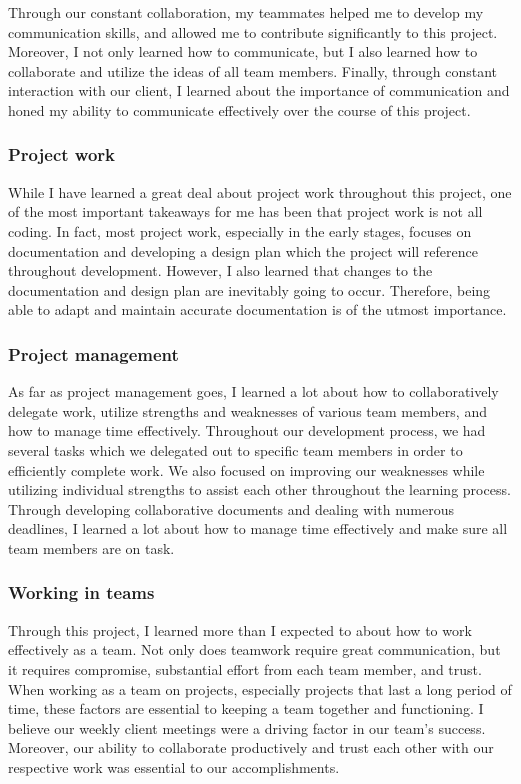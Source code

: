 \documentclass[onecolumn, draftclsnofoot,10pt, compsoc]{IEEEtran}
\begin{document}
\begin{flushleft}
Through our constant collaboration, my teammates helped me to develop my communication skills, and allowed me to contribute significantly to this project. Moreover, I not only learned how to communicate, but I also learned how to collaborate and utilize the ideas of all team members. Finally, through constant interaction with our client, I learned about the importance of communication and honed my ability to communicate effectively over the course of this project.
 
\subsubsection{Project work}
While I have learned a great deal about project work throughout this project, one of the most important takeaways for me has been that project work is not all coding. In fact, most project work, especially in the early stages, focuses on documentation and developing a design plan which the project will reference throughout development. However, I also learned that changes to the documentation and design plan are inevitably going to occur. Therefore, being able to adapt and maintain accurate documentation is of the utmost importance.
 
\subsubsection{Project management}
As far as project management goes, I learned a lot about how to collaboratively delegate work, utilize strengths and weaknesses of various team members, and how to manage time effectively. Throughout our development process, we had several tasks which we delegated out to specific team members in order to efficiently complete work. We also focused on improving our weaknesses while utilizing individual strengths to assist each other throughout the learning process. Through developing collaborative documents and dealing with numerous deadlines, I learned a lot about how to manage time effectively and make sure all team members are on task.
 
\subsubsection{Working in teams}
Through this project, I learned more than I expected to about how to work effectively as a team. Not only does teamwork require great communication, but it requires compromise, substantial effort from each team member, and trust. When working as a team on projects, especially projects that last a long period of time, these factors are essential to keeping a team together and functioning. I believe our weekly client meetings were a driving factor in our team's success. Moreover, our ability to collaborate productively and trust each other with our respective work was essential to our accomplishments.
 

\end{flushleft}
\end{document}
